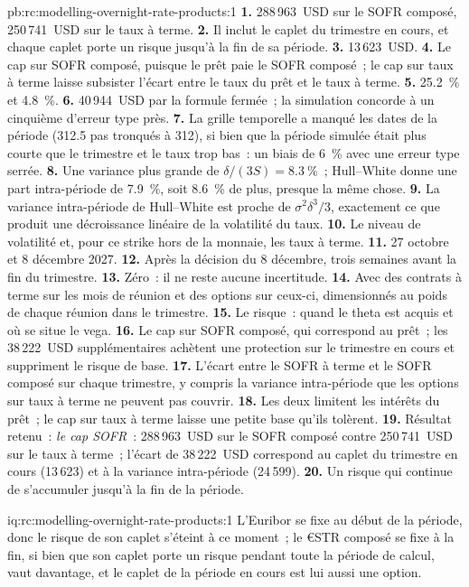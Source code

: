 \begin{solution}{pb:rc:modelling-overnight-rate-products:1}
\textbf{1.} 288\,963~USD sur le SOFR composé, 250\,741~USD sur le taux à terme.
\textbf{2.} Il inclut le caplet du trimestre en cours, et chaque caplet porte un risque
jusqu'à la fin de sa période.
\textbf{3.} 13\,623~USD.
\textbf{4.} Le cap sur SOFR composé, puisque le prêt paie le SOFR composé~; le cap sur taux à
terme laisse subsister l'écart entre le taux du prêt et le taux à terme.
\textbf{5.} 25.2~\% et 4.8~\%.
\textbf{6.} 40\,944~USD par la formule fermée~; la simulation concorde à un cinquième
d'erreur type près.
\textbf{7.} La grille temporelle a manqué les dates de la période (312.5 pas tronqués à 312), si bien que
la période simulée était plus courte que le trimestre et le taux trop bas~: un biais de 6~\% avec une
erreur type serrée.
\textbf{8.} Une variance plus grande de $\delta/(3S) = 8.3~\%$~; Hull--White donne une part intra-période
de 7.9~\%, soit 8.6~\% de plus, presque la même chose.
\textbf{9.} La variance intra-période de Hull--White est proche de $\sigma^2\delta^3/3$, exactement ce que
produit une décroissance linéaire de la volatilité du taux.
\textbf{10.} Le niveau de volatilité et, pour ce strike hors de la monnaie, les
taux à terme.
\textbf{11.} 27 octobre et 8 décembre 2027.
\textbf{12.} Après la décision du 8 décembre, trois semaines avant la fin du trimestre.
\textbf{13.} Zéro~: il ne reste aucune incertitude.
\textbf{14.} Avec des contrats à terme sur les mois de réunion et des options sur ceux-ci, dimensionnés au
poids de chaque réunion dans le trimestre.
\textbf{15.} Le risque~: quand le theta est acquis et où se situe le vega.
\textbf{16.} Le cap sur SOFR composé, qui correspond au prêt~; les 38\,222~USD supplémentaires achètent
une protection sur le trimestre en cours et suppriment le risque de base.
\textbf{17.} L'écart entre le SOFR à terme et le SOFR composé sur chaque trimestre, y compris la
variance intra-période que les options sur taux à terme ne peuvent pas couvrir.
\textbf{18.} Les deux limitent les intérêts du prêt~; le cap sur taux à terme laisse une petite base
qu'ils tolèrent.
\textbf{19.} Résultat retenu~: \emph{le cap SOFR}~: 288\,963~USD sur le SOFR composé contre
250\,741~USD sur le taux à terme~; l'écart de 38\,222~USD correspond au caplet du trimestre en
cours (13\,623) et à la variance intra-période (24\,599).
\textbf{20.} Un risque qui continue de s'accumuler jusqu'à la fin de la période.
\end{solution}

\begin{solution}{iq:rc:modelling-overnight-rate-products:1}
L'Euribor se fixe au début de la période, donc le risque de son caplet s'éteint à ce moment~;
le €STR composé se fixe à la fin, si bien que son caplet porte un risque pendant toute la
période de calcul, vaut davantage, et le caplet de la période en cours est lui aussi une option.
\end{solution}

